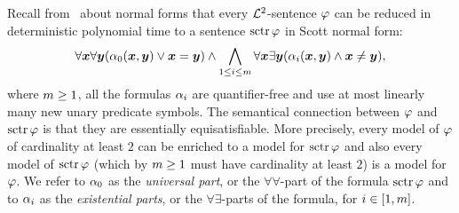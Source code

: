 Recall from~ about normal forms that every $\mathcal{L}^{2}$-sentence
$\varphi$ can be reduced in deterministic polynomial time to a sentence
$\operatorname{sctr}\varphi$ in Scott normal form:
\[
  \forall\bm{x}\forall\bm{y} (\alpha_{0}(\bm{x},\bm{y}) \lor \bm{x} = \bm{y}) \land
  \bigwedge_{1 \leq i \leq m} \forall\bm{x}\exists\bm{y}(
  \alpha_{i}(\bm{x},\bm{y}) \land \bm{x} \neq \bm{y}),
\]
where $m \geq 1$, all the formulas $\alpha_{i}$ are quantifier-free and use at
most linearly many new unary predicate symbols.
The semantical connection between $\varphi$ and $\operatorname{sctr}\varphi$ is that they are
essentially equisatisfiable. More precisely, every model of $\varphi$ of
cardinality at least $2$ can be enriched to a model for $\operatorname{sctr}\varphi$ and also
every model of $\operatorname{sctr}\varphi$ (which by $m \geq 1$ must have cardinality at
least $2$) is a model for $\varphi$.
We refer to $\alpha_{0}$ as the \emph{universal part}, or the
$\forall\forall$-part of the formula $\operatorname{sctr}\varphi$ and to $\alpha_{i}$ as the \emph{existential parts}, or the $\forall\exists$-parts of the formula,
for $i \in [1,m]$.
